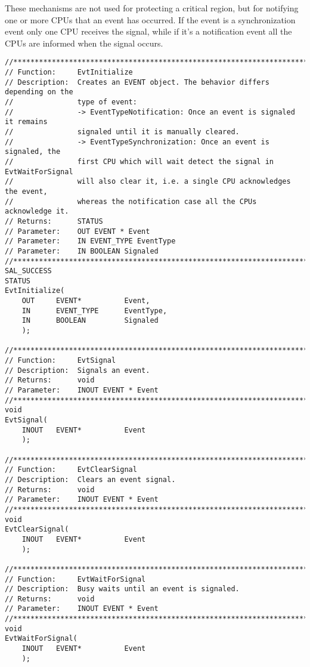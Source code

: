 \begin{appendices}
These mechanisms are not used for protecting a critical region, but for notifying one or more CPUs
that an event has occurred. If the event is a synchronization event only one CPU receives the signal,
while if it's a notification event all the CPUs are informed when the signal occurs.

\begin{lstlisting}[caption={Event Interface},label={lst:Event}]
//******************************************************************************
// Function:     EvtInitialize
// Description:  Creates an EVENT object. The behavior differs depending on the
//               type of event:
//               -> EventTypeNotification: Once an event is signaled it remains
//               signaled until it is manually cleared.
//               -> EventTypeSynchronization: Once an event is signaled, the
//               first CPU which will wait detect the signal in EvtWaitForSignal
//               will also clear it, i.e. a single CPU acknowledges the event,
//               whereas the notification case all the CPUs acknowledge it.
// Returns:      STATUS
// Parameter:    OUT EVENT * Event
// Parameter:    IN EVENT_TYPE EventType
// Parameter:    IN BOOLEAN Signaled
//******************************************************************************
SAL_SUCCESS
STATUS
EvtInitialize(
    OUT     EVENT*          Event,
    IN      EVENT_TYPE      EventType,
    IN      BOOLEAN         Signaled
    );

//******************************************************************************
// Function:     EvtSignal
// Description:  Signals an event.
// Returns:      void
// Parameter:    INOUT EVENT * Event
//******************************************************************************
void
EvtSignal(
    INOUT   EVENT*          Event
    );

//******************************************************************************
// Function:     EvtClearSignal
// Description:  Clears an event signal.
// Returns:      void
// Parameter:    INOUT EVENT * Event
//******************************************************************************
void
EvtClearSignal(
    INOUT   EVENT*          Event
    );

//******************************************************************************
// Function:     EvtWaitForSignal
// Description:  Busy waits until an event is signaled.
// Returns:      void
// Parameter:    INOUT EVENT * Event
//******************************************************************************
void
EvtWaitForSignal(
    INOUT   EVENT*          Event
    );


\end{lstlisting}
\end{appendices}
